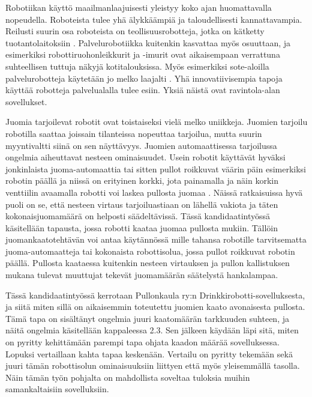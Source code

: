 Robotiikan käyttö maailmanlaajuisesti yleistyy koko ajan huomattavalla nopeudella. Roboteista tulee yhä älykkäämpiä ja taloudellisesti kannattavampia. Reilusti suurin osa roboteista on teollisuusrobotteja, jotka on kätketty tuotantolaitoksiin \cite{Heer2020}. Palvelurobotiikka kuitenkin kasvattaa myös osuuttaan, ja esimerkiksi robottiruohonleikkurit ja -imurit ovat aikaisempaan verrattuna suhteellisen tuttuja näkyjä kotitalouksissa. Myös esimerkiksi sote-aloilla palvelurobotteja käytetään jo melko laajalti \cite{Jyvaskylanyliopisto2018}. Yhä innovatiivisempia tapoja käyttää robotteja palvelualalla tulee esiin. Yksiä näistä ovat ravintola-alan sovellukset.

Juomia tarjoilevat robotit ovat toistaiseksi vielä melko uniikkeja. Juomien tarjoilu robotilla saattaa joissain tilanteissa nopeuttaa tarjoilua, mutta suurin myyntivaltti siinä on sen näyttävyys. Juomien automaattisessa tarjoilussa ongelmia aiheuttavat nesteen ominaisuudet. Usein robotit käyttävät hyväksi jonkinlaista juoma-automaattia \cite{Kelly2020} tai sitten pullot roikkuvat väärin päin esimerkiksi robotin päällä ja niissä on erityinen korkki, jota painamalla ja näin korkin venttiilin avaamalla robotti voi laskea pullosta juomaa \cite{Ro2016}. Näissä ratkaisuissa hyvä puoli on se, että nesteen virtaus tarjoiluastiaan on lähellä vakiota ja täten kokonaisjuomamäärä on helposti säädeltävissä. Tässä kandidaatintyössä käsitellään tapausta, jossa robotti kaataa juomaa pullosta mukiin. Tällöin juomankaatotehtävän voi antaa käytännössä mille tahansa robotille tarvitsematta juoma-automaatteja tai kokonaista robottisolua, jossa pullot roikkuvat robotin päällä. Pullosta kaataessa kuitenkin nesteen virtauksen ja pullon kallistuksen mukana tulevat muuttujat tekevät juomamäärän säätelystä hankalampaa.

Tässä kandidaatintyössä kerrotaan Pullonkaula ry:n Drinkkirobotti-sovelluksesta, ja siitä miten sillä on aikaisemmin toteutettu juomien kaato avonaisesta pullosta. Tämä tapa on sisältänyt ongelmia juuri kaatomäärän tarkkuuden suhteen, ja näitä ongelmia käsitellään kappaleessa 2.3. Sen jälkeen käydään läpi sitä, miten on pyritty kehittämään parempi tapa ohjata kaadon määrää sovelluksessa. Lopuksi vertaillaan kahta tapaa keskenään. Vertailu on pyritty tekemään sekä juuri tämän robottisolun ominaisuuksiin liittyen että myös yleisemmällä tasolla. Näin tämän työn pohjalta on mahdollista soveltaa tuloksia muihin samankaltaisiin sovelluksiin.
